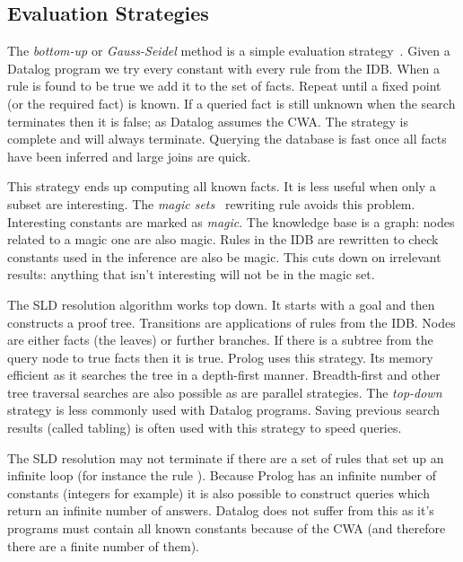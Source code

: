 \documentclass[a4paper]{article}
\begin{document}
\subsection{Evaluation Strategies}

The \emph{bottom-up} or \emph{Gauss-Seidel} method is a simple evaluation
strategy~\cite{Ceri:1989ff}.  Given a Datalog program we try every constant with
every rule from the \ac{IDB}.  When a rule is found to be true we add it to the set
of facts.  Repeat until a fixed point (or the required fact) is known.  If a
queried fact is still unknown when the search terminates then it is false; as Datalog assumes
the \ac{CWA}.  The strategy is complete and will always
terminate. Querying the database is fast once all facts have been inferred 
and large joins are quick.

This strategy ends up computing all known facts. It is less useful when only a
subset are interesting.  The \emph{magic sets}~\cite{Bancilhon:1985cz} rewriting
rule avoids this problem.  Interesting constants are marked as \emph{magic}. The
knowledge base is a graph: nodes related to a magic one are also magic.  Rules
in the \ac{IDB} are rewritten to check constants used in the inference are also
be magic.  This cuts down on irrelevant results: anything that isn't
interesting will not be in the magic set.

The \ac{SLD} resolution algorithm works top down. It starts with a goal and then
constructs a proof tree. Transitions are applications of rules from the
\ac{IDB}. Nodes are either facts (the leaves) or further branches.  If there is
a subtree from the query node to true facts then it is true.  Prolog uses this
strategy.  Its memory efficient as it searches the tree in a depth-first manner.
Breadth-first and other tree traversal searches are also possible as are
parallel strategies.  The \emph{top-down} strategy is less commonly used with
Datalog programs. Saving previous search results (called tabling) is often used
with this strategy to speed queries.


The \ac{SLD} resolution may not terminate if there are a set of rules that set
up an infinite loop (for instance the rule ).  Because
Prolog has an infinite number of constants (integers for example) it is also
possible to construct queries which return an infinite number of answers.
Datalog does not suffer from this as it's programs must contain all known
constants because of the \ac{CWA} (and therefore there are a finite number of
them).
\end{document}
